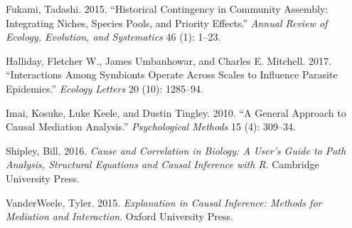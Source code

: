 \documentclass[]{article}
\begin{document}
\leavevmode\hypertarget{ref-fukami2015historical}{}%
Fukami, Tadashi. 2015. ``Historical Contingency in Community Assembly:
Integrating Niches, Species Pools, and Priority Effects.'' \emph{Annual
Review of Ecology, Evolution, and Systematics} 46 (1): 1--23.

\leavevmode\hypertarget{ref-halliday2017interactions}{}%
Halliday, Fletcher W., James Umbanhowar, and Charles E. Mitchell. 2017.
``Interactions Among Symbionts Operate Across Scales to Influence
Parasite Epidemics.'' \emph{Ecology Letters} 20 (10): 1285--94.

\leavevmode\hypertarget{ref-imai2010general}{}%
Imai, Kosuke, Luke Keele, and Dustin Tingley. 2010. ``A General Approach
to Causal Mediation Analysis.'' \emph{Psychological Methods} 15 (4):
309--34.

\leavevmode\hypertarget{ref-shipley2016cause}{}%
Shipley, Bill. 2016. \emph{Cause and Correlation in Biology: A User's
Guide to Path Analysis, Structural Equations and Causal Inference with
R}. Cambridge University Press.

\leavevmode\hypertarget{ref-vanderweele2015explanation}{}%
VanderWeele, Tyler. 2015. \emph{Explanation in Causal Inference: Methods
for Mediation and Interaction}. Oxford University Press.
\end{document}
